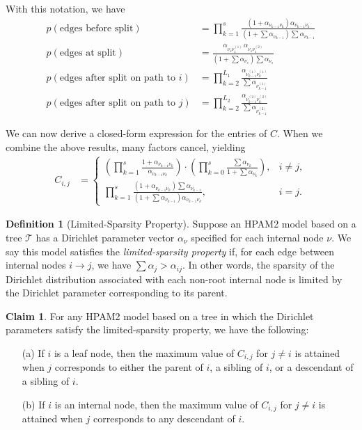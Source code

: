 \documentclass{article}
\theoremstyle{definition}
\newtheorem{claim}[thm]{Claim}
\newtheorem{defn}[thm]{Definition}
\begin{document}
With this notation, we have
\begin{align}
p(\text{edges before split})
&=
\prod_{k=1}^s \frac
  {\left( 1 + \alpha_{\nu_{k-1} \nu_k} \right) \alpha_{\nu_{k-1} \nu_k} }
  {\left( 1 + \sum \alpha_{\nu_{k-1}} \right) \sum \alpha_{\nu_{k-1}} }
\\
p(\text{edges at split})
&= \frac
  {\alpha_{\nu_s \nu^{(1)}_1} \, \alpha_{\nu_s \nu^{(2)}_1}}
  { \left( 1 + \sum \alpha_{\nu_s} \right) \sum \alpha_{\nu_s} }
\\
p(\text{edges after split on path to $i$})
&=
\prod_{k=2}^{L_1} \frac
  {\alpha_{\nu^{(1)}_{k-1} \nu^{(1)}_k} }
  { \sum \alpha_{\nu^{(1)}_{k-1}} }
\label{eqn:singleFactorI}
\\
p(\text{edges after split on path to $j$})
&=
\prod_{k=2}^{L_2} \frac
  {\alpha_{\nu^{(2)}_{k-1} \nu^{(2)}_k} }
  { \sum \alpha_{\nu^{(2)}_{k-1}} }
\label{eqn:singleFactorJ}
\end{align}

We can now derive a closed-form expression for the entries of $C$.
When we combine the above results, many factors cancel, yielding
\begin{align}
C_{i,j}
&=
\begin{cases}
\left(
  \prod_{k=1}^s
  \frac { 1 + \alpha_{\nu_{k-1} \nu_k} } { \alpha_{\nu_{k-1} \nu_k} }
\right)
\cdot
\left(
  \prod_{k=0}^s
  \frac { \sum \alpha_{\nu_k} } { 1 + \sum \alpha_{\nu_k} }
\right),
& i \neq j, \\
\prod_{k=1}^s \frac
  { \left( 1 + \alpha_{\nu_{k-1} \nu_k} \right) \sum \alpha_{\nu_{k-1}} }
  { \left( 1 + \sum \alpha_{\nu_{k-1}} \right) \alpha_{\nu_{k-1} \nu_k} },
& i = j.
\end{cases}
\label{eqn:closedFormC}
\end{align}

\begin{defn}[Limited-Sparsity Property]
Suppose an HPAM2 model based on a tree $\mathcal T$ has a Dirichlet parameter vector $\alpha_\nu$ specified for each internal node $\nu$.
We say this model satisfies the \emph{limited-sparsity property} if, for each edge between internal nodes $i \to j$, we have $\sum \alpha_j > \alpha_{ij}$.
In other words, the sparsity of the Dirichlet distribution associated with each non-root internal node is limited by the Dirichlet parameter corresponding to its parent.
\end{defn}

\begin{claim}
For any HPAM2 model based on a tree in which the Dirichlet parameters satisfy the limited-sparsity property, we have the following:
\begin{itemize}
  \item[(a)] If $i$ is a leaf node, then the maximum value of $C_{i,j}$ for $j \neq i$ is attained when $j$ corresponds to either the parent of $i$, a sibling of $i$, or a descendant of a sibling of $i$.
  \item[(b)] If $i$ is an internal node, then the maximum value of $C_{i,j}$ for $j \neq i$ is attained when $j$ corresponds to any descendant of $i$.
\end{itemize}
\label{claim:CMatrixProperty}
\end{claim}
\end{document}
